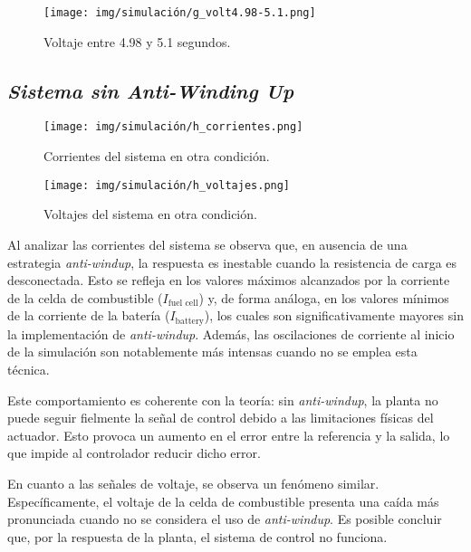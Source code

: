 \begin{figure}[H]
    \centering
    \texttt{[image: img/simulación/g\_volt4.98-5.1.png]}
    \caption{Voltaje entre 4.98 y 5.1 segundos.}
    \label{fig:g_volt4.98-5.1}
\end{figure}

\subsection{\textit{Sistema sin Anti-Winding Up}}

\begin{figure}[H]
    \centering
    \texttt{[image: img/simulación/h\_corrientes.png]}
    \caption{Corrientes del sistema en otra condición.}
    \label{fig:h_corrientes}
\end{figure}

\begin{figure}[H]
    \centering
    \texttt{[image: img/simulación/h\_voltajes.png]}
    \caption{Voltajes del sistema en otra condición.}
    \label{fig:h_voltajes}
\end{figure}
Al analizar las corrientes del sistema se observa que, en ausencia de una estrategia 
\textit{anti-windup}, la respuesta es inestable cuando la resistencia de carga es desconectada.
Esto se refleja en los valores máximos alcanzados por la corriente de la celda de 
combustible ($I_{\text{fuel cell}}$) y, de forma análoga, en los valores 
mínimos de la corriente de la batería ($I_{\text{battery}}$), los cuales son significativamente 
mayores sin la implementación de \textit{anti-windup}. Además, las oscilaciones de corriente 
al inicio de la simulación son notablemente más intensas cuando no se emplea esta técnica.

Este comportamiento es coherente con la teoría: sin 
\textit{anti-windup}, la planta no puede seguir fielmente la señal de control debido a las limitaciones
físicas del actuador. Esto provoca un aumento en el error entre la referencia y la salida, 
lo que impide al controlador reducir dicho error.

En cuanto a las señales de voltaje, se observa un fenómeno similar. 
Específicamente, el voltaje de la celda de combustible presenta una 
caída más pronunciada cuando no se considera el uso de \textit{anti-windup}. Es posible concluir que, por la respuesta
de la planta, el sistema de control no funciona.
